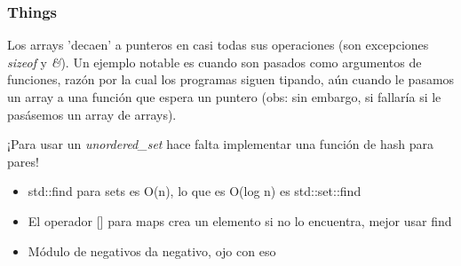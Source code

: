 \subsubsection*{Things}

Los arrays 'decaen' a punteros en casi todas sus operaciones (son excepciones \textit{sizeof} y \textit{\&}). Un ejemplo notable es cuando son pasados como argumentos de funciones, razón por la cual los programas siguen tipando, aún cuando le pasamos un array a una función que espera un puntero (obs: sin embargo, si fallaría si le pasásemos un array de arrays).

¡Para usar un \textit{unordered\_set} hace falta implementar una función de hash para pares!

\begin{itemize}
    \item std::find para sets es O(n), lo que es O(log n) es std::set::find
    \item El operador [] para maps crea un elemento si no lo encuentra, mejor usar find
    \item Módulo de negativos da negativo, ojo con eso
\end{itemize}
